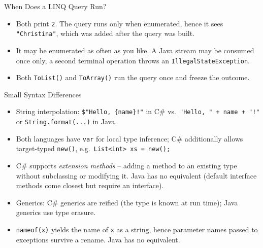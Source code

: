 \begin{solutionframe}{When Does a LINQ Query Run?}
  \begin{itemize}
    \item Both print \texttt{2}. The query runs only when enumerated, hence it
      sees \texttt{"Christina"}, which was added after the query was built.
    \item It may be enumerated as often as you like. A Java stream may be
      consumed once only, a second terminal operation throws an
      \texttt{IllegalStateException}.
    \item Both \texttt{ToList()} and \texttt{ToArray()} run the query once and
      freeze the outcome.
  \end{itemize}
  \vspace{5ex}

\end{solutionframe}

\begin{frame}[fragile]{Small Syntax Differences}
  \begin{itemize}
    \item String interpolation: \texttt{\$"Hello, \{name\}!"} in C\#
      vs.\ \texttt{"Hello, " + name + "!"} or \texttt{String.format(...)}
      in Java.
    \item Both languages have \texttt{var} for local type inference; C\#
      additionally allows target-typed \texttt{new()}, e.g.\
      \texttt{List<int> xs = new();}
    \item C\# supports \emph{extension methods} -- adding a method to an
      existing type without subclassing or modifying it. Java has no
      equivalent (default interface methods come closest but require an
      interface).
    \item Generics: C\# generics are reified (the type is known at run
      time); Java generics use type erasure.
    \item \texttt{nameof(x)} yields the name of \texttt{x} as a string, hence
      parameter names passed to exceptions survive a rename. Java has no
      equivalent.
  \end{itemize}
  \vfill


\end{frame}

